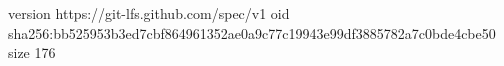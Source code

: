version https://git-lfs.github.com/spec/v1
oid sha256:bb525953b3ed7cbf864961352ae0a9c77c19943e99df3885782a7c0bde4cbe50
size 176
